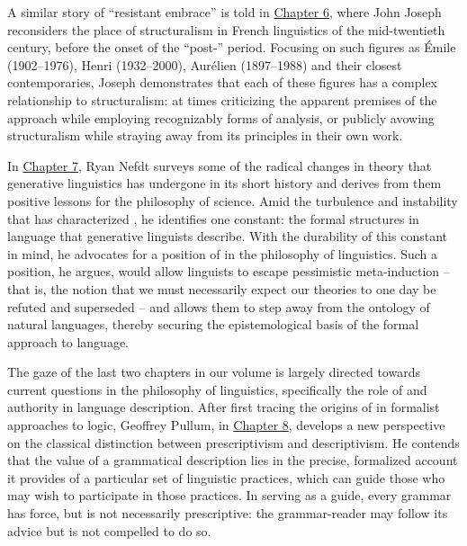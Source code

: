 \documentclass[output=paper]{langscibook}
\begin{document}
A similar story of ``resistant embrace'' is told in \hyperref[chap:joseph]{Chapter 6}, where John Joseph reconsiders the place of structuralism in French linguistics of the mid-twentieth century, before the onset of the ``post-'' period. Focusing on such figures as Émile {\Benveniste} (1902--1976), Henri {\Meschonnic} (1932--2000), Aurélien {\Sauvageot} (1897--1988) and their closest contemporaries, Joseph demonstrates that each of these figures has a complex relationship to structuralism: at times criticizing the apparent premises of the approach while employing recognizably  forms of analysis, or publicly avowing structuralism while straying away from its principles in their own work.

In \hyperref[chap:nefdt]{Chapter 7}, Ryan Nefdt surveys some of the radical changes in theory that generative linguistics has undergone in its short history and derives from them positive lessons for the philosophy of science. Amid the turbulence and instability that has characterized , he identifies one constant: the formal structures in language that generative linguists describe. With the durability of this constant in mind, he advocates for a position of  in the philosophy of linguistics. Such a position, he argues, would allow linguists to escape pessimistic meta-induction -- that is, the notion that we must necessarily expect our theories to one day be refuted and superseded -- and allows them to step away from the ontology of natural languages, thereby securing the epistemological basis of the formal approach to language.

The gaze of the last two chapters in our volume is largely directed towards current questions in the philosophy of linguistics, specifically the role of  and authority in language description. After first tracing the origins of  in formalist approaches to logic, Geoffrey Pullum, in \hyperref[chap:pullum]{Chapter 8}, develops a new perspective on the classical distinction between prescriptivism and descriptivism. He contends that the value of a grammatical description lies in the precise, formalized account it provides of a particular set of linguistic practices, which can guide those who may wish to participate in those practices. In serving as a guide, every grammar has  force, but is not necessarily prescriptive: the grammar-reader may follow its advice but is not compelled to do so.
\end{document}
